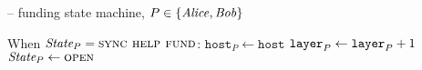 \begin{center}
\begin{systembox}{\fchan{} -- funding state machine, $P \in \{\mathit{Alice}, \mathit{Bob}\}$}
\begin{algorithmic}[1]
      \State When $\itistate_P = \textsc{sync help fund}$:
      \Indent
          \State $\texttt{host}_P \gets \texttt{host}$
          \State {}
          \State $\texttt{layer}_{P} \gets \texttt{layer}_{P} + 1$
          \State $\itistate_P \gets \textsc{open}$
          \label{code:functionality:fund:help-fund-end}
        \EndIf
      \EndIndent
    \end{algorithmic}
  \end{systembox}
  \label{code:functionality:fund}
\end{center} \ \\

